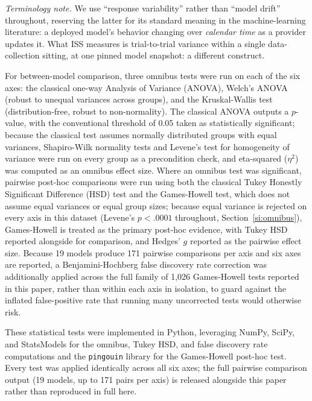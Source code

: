 \documentclass[11pt]{article}
\begin{document}
\textit{Terminology note.} We use ``response variability'' rather than
``model drift'' throughout, reserving the latter for its standard meaning in
the machine-learning literature: a deployed model's behavior changing over
\emph{calendar time} as a provider updates it. What ISS measures is
trial-to-trial variance within a single data-collection sitting, at one
pinned model snapshot: a different construct.

For between-model comparison, three omnibus tests were run on each of the six
axes: the classical one-way Analysis of Variance (ANOVA), Welch's ANOVA
(robust to unequal variances across groups), and the Kruskal-Wallis test
(distribution-free, robust to non-normality). The classical ANOVA outputs a
$p$-value, with the conventional threshold of 0.05 taken as statistically
significant; because the classical test assumes normally distributed groups
with equal variances, Shapiro-Wilk normality tests and Levene's test for
homogeneity of variance were run on every group as a precondition check, and
eta-squared ($\eta^2$) was computed as an omnibus effect size. Where an
omnibus test was significant, pairwise post-hoc comparisons were run using
both the classical Tukey Honestly Significant Difference (HSD) test
\citep{tukey1949} and the Games-Howell test, which does not assume equal
variances or equal group sizes; because equal variance is rejected on every
axis in this dataset (Levene's $p<.0001$ throughout, Section~\ref{si:omnibus}),
Games-Howell is treated as the primary post-hoc evidence, with Tukey HSD
reported alongside for comparison, and Hedges' $g$ reported as the pairwise
effect size. Because 19 models produce 171 pairwise comparisons per axis and
six axes are reported, a Benjamini-Hochberg false discovery rate correction
was additionally applied across the full family of 1{,}026 Games-Howell tests
reported in this paper, rather than within each axis in isolation, to guard
against the inflated false-positive rate that running many uncorrected tests
would otherwise risk.

These statistical tests were implemented in Python, leveraging NumPy, SciPy,
and StatsModels for the omnibus, Tukey HSD, and false discovery rate
computations \citep{seabold2010, virtanen2020, harris2020} and the
\texttt{pingouin} library for the Games-Howell post-hoc test. Every test was
applied identically across all six axes; the full pairwise comparison output
(19 models, up to 171 pairs per axis) is released alongside this paper rather
than reproduced in full here.
\end{document}

